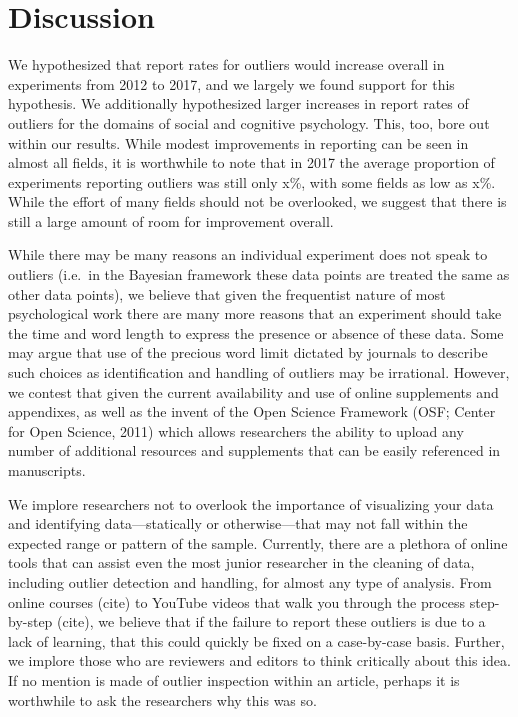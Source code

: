 \documentclass[english,man]{apa6}
\theoremstyle{definition}
\theoremstyle{definition}
\theoremstyle{definition}
\theoremstyle{remark}
\begin{document}
\section{Discussion}\label{discussion}

We hypothesized that report rates for outliers would increase overall in
experiments from 2012 to 2017, and we largely we found support for this
hypothesis. We additionally hypothesized larger increases in report
rates of outliers for the domains of social and cognitive psychology.
This, too, bore out within our results. While modest improvements in
reporting can be seen in almost all fields, it is worthwhile to note
that in 2017 the average proportion of experiments reporting outliers
was still only x\%, with some fields as low as x\%. While the effort of
many fields should not be overlooked, we suggest that there is still a
large amount of room for improvement overall.

While there may be many reasons an individual experiment does not speak
to outliers (i.e.~in the Bayesian framework these data points are
treated the same as other data points), we believe that given the
frequentist nature of most psychological work there are many more
reasons that an experiment should take the time and word length to
express the presence or absence of these data. Some may argue that use
of the precious word limit dictated by journals to describe such choices
as identification and handling of outliers may be irrational. However,
we contest that given the current availability and use of online
supplements and appendixes, as well as the invent of the Open Science
Framework (OSF; Center for Open Science, 2011) which allows researchers
the ability to upload any number of additional resources and supplements
that can be easily referenced in manuscripts.

We implore researchers not to overlook the importance of visualizing
your data and identifying data---statically or otherwise---that may not
fall within the expected range or pattern of the sample. Currently,
there are a plethora of online tools that can assist even the most
junior researcher in the cleaning of data, including outlier detection
and handling, for almost any type of analysis. From online courses
(cite) to YouTube videos that walk you through the process step-by-step
(cite), we believe that if the failure to report these outliers is due
to a lack of learning, that this could quickly be fixed on a
case-by-case basis. Further, we implore those who are reviewers and
editors to think critically about this idea. If no mention is made of
outlier inspection within an article, perhaps it is worthwhile to ask
the researchers why this was so.
\end{document}
